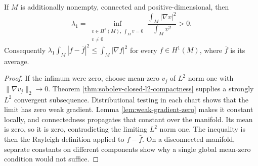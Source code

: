 \begin{corollary}\label{cor:closed-manifold-poincare}
If $M$ is additionally nonempty, connected and positive-dimensional, then
\[
 \lambda_1=\inf_{\substack{v\in H^1(M),\ \int_Mv=0\\v\ne0}}
      \frac{\int_M|\nabla v|^2}{\int_Mv^2}>0.
\]
Consequently $\lambda_1\int_M|f-\bar f|^2\leq\int_M|\nabla f|^2$ for every $f\in H^1(M)$, where $\bar f$ is its average.
\end{corollary}
\begin{proof}
If the infimum were zero, choose mean-zero $v_j$ of $L^2$ norm one with $\|\nabla v_j\|_2\to0$. Theorem \ref{thm:sobolev-closed-l2-compactness} supplies a strongly $L^2$ convergent subsequence. Distributional testing in each chart shows that the limit has zero weak gradient. Lemma \ref{lem:weak-gradient-zero} makes it constant locally, and connectedness propagates that constant over the manifold. Its mean is zero, so it is zero, contradicting the limiting $L^2$ norm one. The inequality is then the Rayleigh definition applied to $f-\bar f$. On a disconnected manifold, separate constants on different components show why a single global mean-zero condition would not suffice.
\end{proof}
